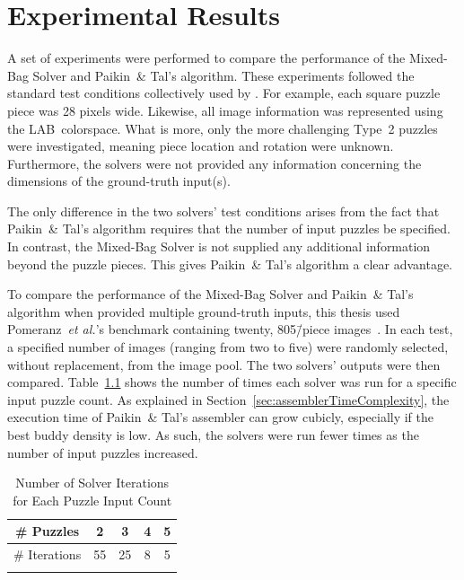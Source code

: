 \chapter{Experimental Results}\label{chap:experimentalResults}

A set of experiments were performed to compare the performance of the Mixed-Bag Solver and Paikin~\& Tal's algorithm.  These experiments followed the standard test conditions collectively used by \cite{cho2010, pomeranz2011, gallagher2012, sholomon2013, paikin2015}.  For example, each square puzzle piece was 28 pixels wide.  Likewise, all image information was represented using the LAB~colorspace.  What is more, only the more challenging Type~2 puzzles were investigated, meaning piece location and rotation were unknown.  Furthermore, the solvers were not provided any information concerning the dimensions of the ground-truth input(s).

The only difference in the two solvers' test conditions arises from the fact that Paikin~\& Tal's algorithm requires that the number of input puzzles be specified. In contrast, the Mixed-Bag Solver is not supplied any additional information beyond the puzzle pieces.  This gives Paikin~\& Tal's algorithm a clear advantage.

To compare the performance of the Mixed-Bag Solver and Paikin~\& Tal's algorithm when provided multiple ground-truth inputs, this thesis used Pomeranz~\textit{et al.}'s benchmark containing twenty, 805\=/piece images~\cite{pomeranzBenchmarkImages}.  In each test, a specified number of images (ranging from two to five) were randomly selected, without replacement, from the image pool.  The two solvers' outputs were then compared.  Table~\ref{tab:numberSolverIterations} shows the number of times each solver was run for a specific input puzzle count. As explained in Section~\ref{sec:assemblerTimeComplexity}, the execution time of Paikin~\& Tal's assembler can grow cubicly, especially if the best buddy density is low.  As such, the solvers were run fewer times as the number of input puzzles increased.

\begin{table}[tb]
  \begin{center}
    \caption{Number of Solver Iterations for Each Puzzle Input Count}\label{tab:numberSolverIterations}
    \begin{tabular}{ |c||c|c|c|c| } 
      \Xhline{1pt}
       \# Puzzles    &  2 &  3 & 4 & 5 \\ 
      \hline \hline
       \# Iterations & 55 & 25 & 8 & 5 \\ 
       \Xhline{1pt}
    \end{tabular}
  \end{center}
\end{table}

